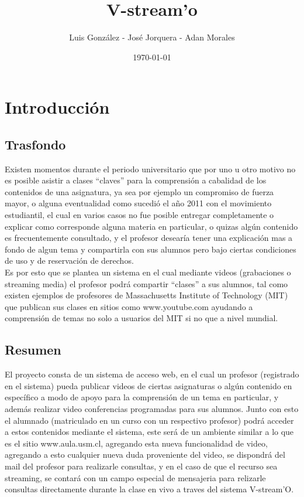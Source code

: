 \documentclass[12pt]{article}
\title{V-stream'o}
\author{Luis González - José Jorquera - Adan Morales}
\date{\today}
\begin{document}
\maketitle
\thispagestyle{empty}

\newpage
\section{Introducción}
\subsection{Trasfondo}
Existen momentos durante el periodo universitario que por uno u otro motivo no es posible asistir a clases 
``claves'' para la comprensión a cabalidad de los contenidos de una asignatura, ya sea por ejemplo un 
compromiso de fuerza mayor, o alguna eventualidad como sucedió el a\~no 2011 con el movimiento estudiantil, 
el cual en varios casos no fue posible entregar completamente o explicar como corresponde alguna materia 
en particular, o quizas algún contenido es frecuentemente consultado, y el profesor desearía tener una 
explicación mas a fondo de algun tema y compartirla con sus alumnos pero bajo ciertas condiciones de uso
y de reservación de derechos.\\
Es por esto que se plantea un sistema en el cual mediante videos (grabaciones o streaming media) el profesor
podrá compartir ``clases'' a sus alumnos, tal como existen ejemplos de profesores de Massachusetts Institute of Technology (MIT) que publican sus clases en sitios como www.youtube.com ayudando a comprensión de temas
no solo a usuarios del MIT si no que a nivel mundial.

\subsection{Resumen}
El proyecto consta de un sistema de acceso web, en el cual un profesor (registrado en el sistema) pueda 
publicar videos de ciertas asignaturas o algún contenido en específico a modo de apoyo para la comprensión
de un tema en particular, y además realizar video conferencias programadas para sus alumnos. Junto con esto
el alumnado (matriculado en un curso con un respectivo profesor) podrá acceder a estos contenidos mediante
el sistema, este será de un ambiente similar a lo que es el sitio www.aula.usm.cl, agregando esta nueva
funcionalidad de video, agregando a esto cualquier nueva duda proveniente del video, se dispondrá del mail 
del profesor para realizarle consultas, y en el caso de que el recurso sea streaming, se contará con un campo
especial de mensajeria para relizarle consultas directamente durante la clase en vivo a traves del sistema
V-stream'O.
\end{document}
